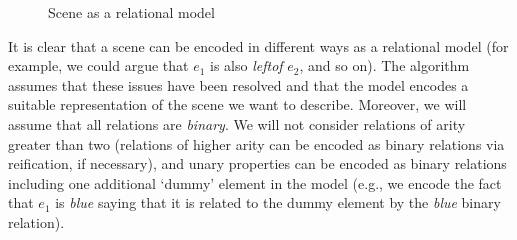\begin{figure}[ht]
\begin{minipage}[b]{0.6\linewidth}
\caption{Scene as a relational model}
\label{GRE3D7-stimulus-graph}
\end{minipage}
\end{figure}

It is clear that a scene can be encoded in different ways as a relational model (for example, we could argue that $e_1$ is also \emph{leftof} $e_2$, and so on). The algorithm assumes that these issues have been resolved and that the model encodes a suitable representation of the scene we want to describe. Moreover, we will assume that all relations are \emph{binary}. We will not consider relations of arity greater than two (relations of higher arity can be encoded as binary relations via reification, if necessary), and unary
properties can be encoded as binary relations including one additional `dummy' element in the model (e.g., we encode the fact that $e_1$ is \emph{blue} saying that it is related to the dummy element by the \emph{blue} binary relation).

